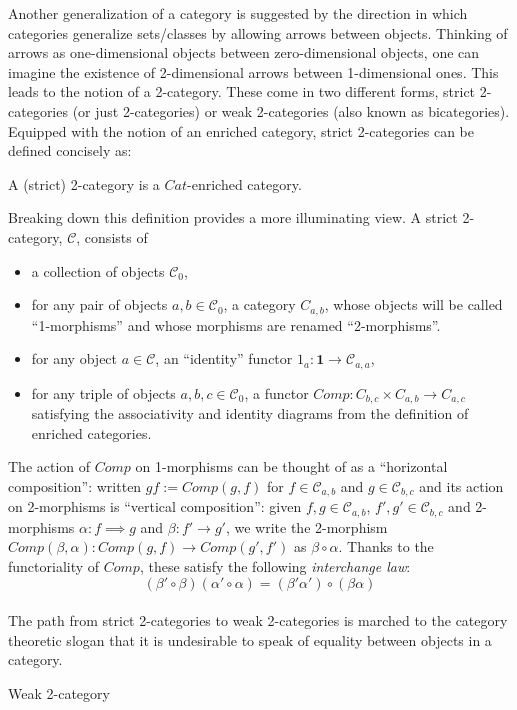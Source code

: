Another generalization of a category is suggested by the direction in which categories generalize sets/classes by allowing arrows between objects. Thinking of arrows as one-dimensional objects between zero-dimensional objects, one can imagine the existence of 2-dimensional arrows between 1-dimensional ones. This leads to the notion of a 2-category. These come in two different forms, strict 2-categories (or just 2-categories) or weak 2-categories (also known as bicategories). Equipped with the notion of an enriched category, strict 2-categories can be defined concisely as:
\begin{defn}
  A (strict) 2-category is a $Cat$-enriched category.
\end{defn}
Breaking down this definition provides a more illuminating view. A strict 2-category, $\mathcal{C}$, consists of
\begin{itemize}
\item a collection of objects $\mathcal{C}_0$,
\item for any pair of objects $a, b \in \mathcal{C}_0$, a category $C_{a, b}$, whose objects will be called ``1-morphisms'' and whose morphisms are renamed ``2-morphisms''.
\item for any object $a \in \mathcal{C}$, an ``identity'' functor $1_a : \mathbf{1} \to \mathcal{C}_{a, a}$, 
\item for any triple of objects $a, b, c \in \mathcal{C}_0$, a functor $Comp : C_{b, c} \times C_{a, b} \to C_{a, c}$
  satisfying the associativity and identity diagrams from the definition of enriched categories.
\end{itemize}
The action of $Comp$ on 1-morphisms can be thought of as a ``horizontal composition'': written $gf := Comp(g, f)$ for $f \in \mathcal{C}_{a, b}$ and $g \in \mathcal{C}_{b, c}$ and its action on 2-morphisms is ``vertical composition'': given $f, g \in \mathcal{C}_{a, b}$, $f', g' \in \mathcal{C}_{b, c}$ and 2-morphisms $\alpha : f \implies g$ and $\beta : f' \to g'$, we write the 2-morphism $Comp(\beta, \alpha) : Comp(g, f) \to Comp(g', f')$ as $\beta \circ \alpha$.
Thanks to the functoriality of $Comp$, these satisfy the following \textit{interchange law}:
\[
  (\beta' \circ \beta)(\alpha'\circ \alpha)=(\beta'\alpha')\circ(\beta\alpha)
\]\\
The path from strict 2-categories to weak 2-categories is marched to the category theoretic slogan that it is undesirable to speak of equality between objects in a category. 
\begin{defn}
  Weak 2-category
\end{defn}


